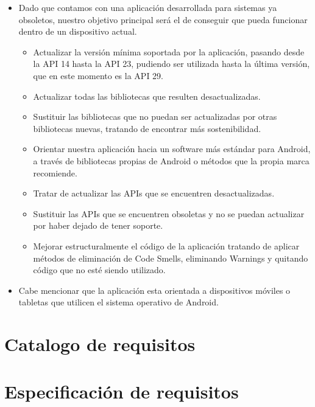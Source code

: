 \begin{itemize}
\item Dado que contamos con una aplicación desarrollada para sistemas ya obsoletos, nuestro objetivo principal será el de conseguir que pueda funcionar dentro de un dispositivo actual.
	\begin{itemize}
	\item Actualizar la versión mínima soportada por la aplicación, pasando desde la API 14 hasta la API 23, pudiendo ser utilizada hasta la última versión, que en este momento es la API 29.
	\item Actualizar todas las bibliotecas que resulten desactualizadas.
	\item Sustituir las bibliotecas que no puedan ser actualizadas por otras bibliotecas nuevas, tratando de encontrar más sostenibilidad.
	\item Orientar nuestra aplicación hacia un software más estándar para Android, a través de bibliotecas propias de Android o métodos que la propia marca recomiende.
	\item Tratar de actualizar las APIs que se encuentren desactualizadas.
	\item Sustituir las APIs que se encuentren obsoletas y no se puedan actualizar por haber dejado de tener soporte.
	\item Mejorar estructuralmente el código de la aplicación tratando de aplicar métodos de eliminación de Code Smells, eliminando Warnings y quitando código que no esté siendo utilizado.
	\end{itemize}
\item Cabe mencionar que la aplicación esta orientada a dispositivos móviles o tabletas que utilicen el sistema operativo de Android.
\end{itemize}

\section{Catalogo de requisitos}

\section{Especificación de requisitos}


